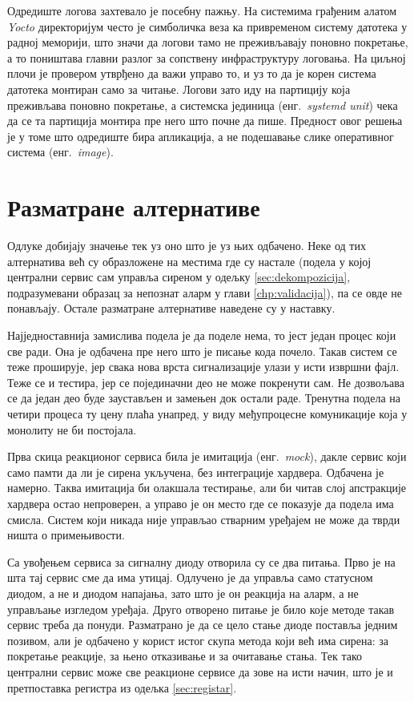 \documentclass[12pt,oneside]{memoir}
\begin{document}
Одредиште логова захтевало је посебну пажњу. На системима грађеним алатом
\emph{Yocto} директоријум  често је симболичка веза
ка привременом систему датотека у
радној меморији, што значи да логови тамо не преживљавају поновно покретање, а то поништава
главни разлог за сопствену инфраструктуру логовања. На циљној плочи је провером утврђено
да важи управо то, и уз то да је корен система датотека монтиран само за читање. Логови зато
иду на партицију која преживљава поновно покретање, а системска јединица (енг.\ \textit{systemd unit}) чека да се та
партиција монтира пре него
што почне да пише. Предност овог решења је у томе што одредиште бира апликација, а не
подешавање слике оперативног система (енг.\ \textit{image}).

\section{Разматране алтернативе}
\label{sec:odbacene}

Одлуке добијају значење тек уз оно што је уз њих одбачено. Неке од тих алтернатива већ су
образложене на местима где су настале (подела у којој централни сервис сам управља сиреном
у одељку \ref{sec:dekompozicija}, подразумевани образац за непознат аларм у глави
\ref{chp:validacija}), па се овде не понављају. Остале разматране алтернативе наведене су у наставку.

Најједноставнија замислива подела је да поделе нема, то јест један процес који све ради. Она је одбачена пре него
што је писање кода почело. Такав систем се теже проширује, јер свака нова врста
сигнализације улази у исти извршни фајл. Теже се и тестира, јер се појединачни део не може
покренути сам. Не дозвољава се да један део буде заустављен и замењен док остали раде.
Тренутна подела на четири процеса ту цену плаћа унапред, у виду међупроцесне комуникације
која у монолиту не би постојала.

Прва скица реакционог сервиса била је имитација (енг.\ \textit{mock}), дакле сервис који само
памти да ли је сирена укључена, без интеграције хардвера. Одбачена је намерно. Таква
имитација би олакшала тестирање, али би читав слој апстракције хардвера остао непроверен, а
управо је он место где се показује да подела има смисла. Систем који никада није управљао
стварним уређајем не може да тврди ништа о примењивости.

Са увођењем сервиса за сигналну диоду отворила су се два питања. Прво је на шта тај сервис сме
да има утицај. Одлучено је да управља само статусном диодом, а не и диодом напајања, зато што је
он реакција на аларм, а не управљање изгледом уређаја. Друго отворено питање је било које методе такав сервис треба да понуди.
Разматрано је да се цело стање диоде поставља једним позивом, али је одбачено у корист истог
скупа метода који већ има сирена:  за покретање реакције,  за
њено отказивање и  за очитавање стања. Тек тако централни сервис може све
реакционе сервисе да зове на исти начин, што је и претпоставка регистра из одељка
\ref{sec:registar}.
\end{document}

